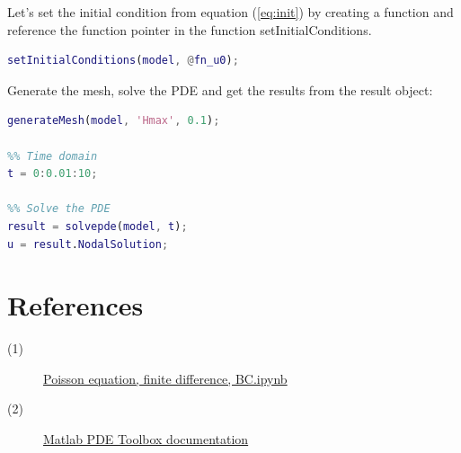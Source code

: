 \documentclass[11pt, a4paper]{article}
\begin{document}
Let's set the initial condition from equation (\ref{eq:init}) by creating a function and reference the function pointer in the function setInitialConditions.

\begin{lstlisting}[language=Matlab]
%% Initial conditions.
setInitialConditions(model, @fn_u0);
\end{lstlisting}


Generate the mesh, solve the PDE and get the results from the result object:
\begin{lstlisting}[language=Matlab]
%% Generate mesh.
generateMesh(model, 'Hmax', 0.1);

%% Time domain
t = 0:0.01:10;

%% Solve the PDE
result = solvepde(model, t);
u = result.NodalSolution;
\end{lstlisting}



\section*{References}
\begin{description}
	\item [(1)] \href{https://github.com/gilbertfrancois/partial-differential-equations/blob/13b389383ceeaa74f6931c4458823bb683fb5a76/notebook/2D%20Poisson%20equation,%20finite%20difference,%20BC.ipynb}{Poisson equation, finite difference, BC.ipynb}
	\item [(2)] \href{https://www.mathworks.com/help/releases/R2017a/pde/index.html}{Matlab PDE Toolbox documentation}
\end{description}
\end{document}
